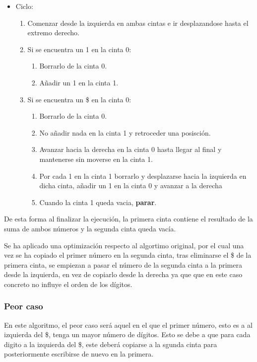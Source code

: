 \begin{itemize}
    \item Ciclo:
    \begin{enumerate}[1.]
        \item Comenzar desde la izquierda en ambas cintas e ir desplazandose hasta el extremo derecho.
        \item Si se encuentra un 1 en la cinta 0:
        \begin{enumerate}[1.]
            \item Borrarlo de la cinta 0.
            \item Añadir un 1 en la cinta 1.
        \end{enumerate}
        \item Si se encuentra un \$ en la cinta 0:
        \begin{enumerate}[1.]
            \item Borrarlo de la cinta 0.
            \item No añadir nada en la cinta 1 y retroceder una posisción.
            \item Avanzar hacia la derecha en la cinta 0 hasta llegar al final y mantenerse sin moverse en la cinta 1.
            \item Por cada 1 en la cinta 1 borrarlo y desplazarse hacia la izquierda en dicha cinta, añadir un 1 en la cinta 0 y avanzar a la derecha
            \item Cuando la cinta 1 queda vacia, \textbf{parar}.
        \end{enumerate}
    \end{enumerate}
\end{itemize}
De esta forma al finalizar la ejecución, la primera cinta contiene el resultado de la suma de ambos números y la segunda cinta queda vacía.\medskip


Se ha aplicado una optimización respecto al algortimo original, por el cual una vez se ha copiado el primer número en la segunda cinta, tras eliminarse el \$ de la primera cinta, se empiezan a pasar el número de la segunda cinta a la primera desde la izquierda, en vez de copiarlo desde la derecha ya que que en este caso concreto no influye el orden de los dígitos.\medskip



\subsubsection*{Peor caso}
En este algoritmo, el peor caso será aquel en el que el primer número, esto es a al izquierda del \$, tenga un mayor número de dígitos. Esto se debe a que para cada digito a la izquierda del \$, este deberá copiarse a la sgunda cinta  para posteriormente escribirse de nuevo en la primera.


